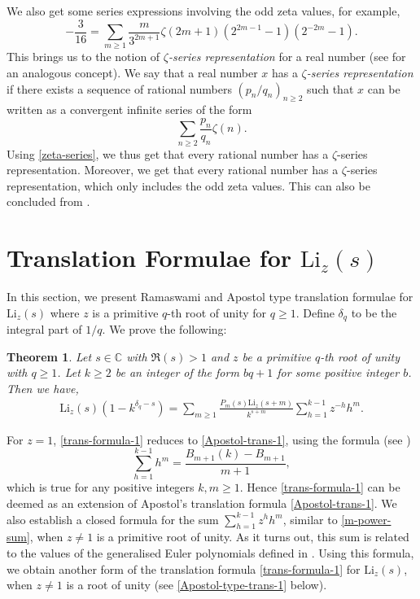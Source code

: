 \documentclass[12pt]{amsart}
\newcommand{\C}{{\mathbb C}}
\newtheorem{thm}{Theorem}
\begin{document}
 We also get some series expressions involving the odd zeta values, for example,
 \begin{equation}\label{zeta-series}
-\frac{3}{16}=\sum_{m\ge 1}\frac{m}{3^{2m+1}}\zeta(2m+1)(2^{2m-1}-1)(2^{-2m}-1).
\end{equation}
This brings us to the notion of {\it $\zeta$-series representation} for a real number
(see \cite{BBC} for an analogous concept). We say that a real number $x$ has a
{\it $\zeta$-series representation} if there exists a sequence of rational numbers $(p_n/q_n)_{n \ge 2}$ 
 such that $x$ can be written as a convergent infinite series of the form
 $$
\sum_{n\geq 2}\frac{p_n}{q_n}\zeta(n).
 $$
Using \eqref{zeta-series}, we thus get that every rational number has a $\zeta$-series representation. Moreover, we get
that every rational number has a $\zeta$-series representation, which only includes the odd zeta values. This can also
be concluded from \cite[eq. (2)]{VR}. 

\section{Translation Formulae for $\mathrm{Li}_{z}(s)$} 
\label{Sec:Trans-formula}

In this section, we present Ramaswami and Apostol type translation formulae for $\mathrm{Li}_z(s)$ where $z$ is a primitive $q$-th root of unity
for $q\geq1$. Define $\delta_q$ to be the integral part of $1/q$. We prove the following:

\begin{thm}\label{trans-thm}
Let $s\in \C$ with $\Re(s)>1$ and $z$ be a primitive $q$-th root of unity with $q\geq1$. Let $k\geq 2$
be an integer of the form $bq+1$ for some positive integer $b$. Then we have,
\begin{align}\label{trans-formula-1}
\mathrm{Li}_z(s)(1-k^{\delta_{q}-s})=\sum_{m\geq1}\frac{P_m(s)\mathrm{Li}_z(s+m)}{k^{s+m}} \sum_{h=1}^{k-1} z^{-h}h^m.
\end{align}
\end{thm}

For $z=1$, \eqref{trans-formula-1} reduces to \eqref{Apostol-trans-1}, using the formula (see \cite[p. 58]{AIK})
\begin{equation}\label{m-power-sum}
\sum_{h=1}^{k-1}h^m=\frac{B_{m+1}(k)-B_{m+1}}{m+1},
\end{equation}
which is true for any positive integers $k,m\geq 1$.
Hence \eqref{trans-formula-1} can be deemed as an extension of Apostol's translation formula \eqref{Apostol-trans-1}. 
We also establish a closed formula for the sum $\sum_{h=1}^{k-1}z^hh^m$, similar to \eqref{m-power-sum},
when $z\neq1$ is a primitive root of unity.
As it turns out, this sum is related to the values of the generalised Euler polynomials defined in \cite[Appendix A]{PB}.
Using this formula, we obtain another form of the translation formula \eqref{trans-formula-1} for $\mathrm{Li}_z(s)$,
when $z\neq 1$ is a root of unity (see \eqref{Apostol-type-trans-1} below).
\end{document}

